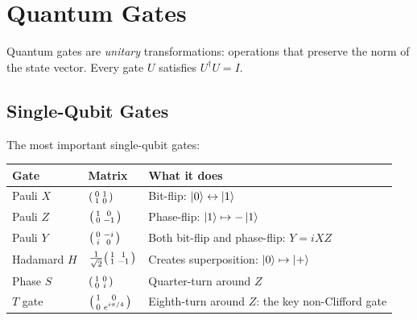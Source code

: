 \documentclass[11pt,a4paper,twoside]{report}
\theoremstyle{definition}
\begin{document}
\section{Quantum Gates}

Quantum gates are \emph{unitary} transformations: operations that
preserve the norm of the state vector. Every gate $U$ satisfies
$U^\dagger U = I$.

\subsection{Single-Qubit Gates}

The most important single-qubit gates:

\begin{center}
\renewcommand{\arraystretch}{1.3}
\begin{tabular}{lll}
\toprule
\textbf{Gate} & \textbf{Matrix} & \textbf{What it does} \\
\midrule
Pauli $X$ & $\begin{psmallmatrix} 0&1\\1&0 \end{psmallmatrix}$ &
  Bit-flip: $\ket{0}\leftrightarrow\ket{1}$ \\
Pauli $Z$ & $\begin{psmallmatrix} 1&0\\0&-1 \end{psmallmatrix}$ &
  Phase-flip: $\ket{1}\mapsto -\ket{1}$ \\
Pauli $Y$ & $\begin{psmallmatrix} 0&-i\\i&0 \end{psmallmatrix}$ &
  Both bit-flip and phase-flip: $Y = iXZ$ \\
Hadamard $H$ & $\frac{1}{\sqrt{2}}\begin{psmallmatrix} 1&1\\1&-1 \end{psmallmatrix}$ &
  Creates superposition: $\ket{0}\mapsto\ket{+}$ \\
Phase $S$ & $\begin{psmallmatrix} 1&0\\0&i \end{psmallmatrix}$ &
  Quarter-turn around $Z$ \\
$T$ gate & $\begin{psmallmatrix} 1&0\\0&e^{i\pi/4} \end{psmallmatrix}$ &
  Eighth-turn around $Z$: the key non-Clifford gate \\
\bottomrule
\end{tabular}
\end{center}
\end{document}
